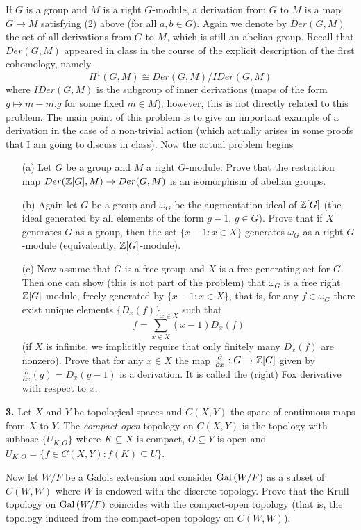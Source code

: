 \documentclass[12pt]{amsart}
\begin{document}
If $G$ is a group and $M$ is a right $G$-module, a derivation from $G$ to $M$ is a map $G\to M$ satisfying (2) above (for all $a,b\in G$).
Again we denote by $Der(G,M)$ the set of all derivations from $G$ to $M$, which is still an abelian group. 
Recall that $Der(G,M)$ appeared in class in the course of the explicit description of the first cohomology,
namely $$H^1(G,M)\cong Der(G,M)/IDer(G,M)$$ where $IDer(G,M)$ is the subgroup of inner derivations (maps of the form $g\mapsto m-m.g$
for some fixed $m\in M$); however, this is not directly related to this problem. The main point of this problem is to give an important example of a derivation in the case of a non-trivial action (which actually arises in some proofs that I am going to discuss in class).
\skv
Now the actual problem begins
\begin{itemize}
\item[(a)] Let $G$ be a group and $M$ a right $G$-module. Prove that the restriction map $Der({\mathbb Z}[G],M)\to Der(G,M)$ is an isomorphism of
abelian groups. 
\item[(b)] Again let $G$ be a group and $\omega_G$ be the augmentation ideal of ${\mathbb Z}[G]$ 
(the ideal generated by all elements of the form $g-1$, $g\in G$). Prove that if $X$ generates $G$ as a group, then the
set $\{x-1: x\in X\}$ generates $\omega_G$ as a right $G$-module (equivalently, ${\mathbb Z}[G]$-module).
\item[(c)] Now assume that $G$ is a free group and $X$ is a free generating set for $G$. Then one can show (this is not part of the problem) that
$\omega_G$ is a free right ${\mathbb Z}[G]$-module, freely generated by $\{x-1: x\in X\}$, that is, for any $f\in \omega_G$ there
exist unique elements $\{D_x(f)\}_{x\in X}$ such that $$f=\sum\limits_{x\in X} (x-1)D_x(f)$$ (if $X$ is infinite, we implicitly require that only finitely many $D_x(f)$ are nonzero). Prove that for any $x\in X$ the map $\frac{\partial}{\partial x}: G\to {\mathbb Z}[G]$
given by $\frac{\partial }{\partial x}(g)=D_x(g-1)$ is a derivation. It is called the (right) {Fox derivative} with respect to $x$.
\end{itemize}
\skv

{\bf 3.} Let $X$ and $Y$ be topological spaces and $C(X,Y)$ the space of continuous maps from $X$ to $Y$. The {\it compact-open} topology
on $C(X,Y)$ is the topology with subbase $\{U_{K,O}\}$ where $K\subseteq X$ is compact, $O\subseteq Y$ is open and 
$U_{K,O}=\{f\in C(X,Y): f(K)\subseteq U\}$.

Now let $W/F$ be a Galois extension and consider ${\rm Gal\,}(W/F)$ as a subset of $C(W,W)$ where $W$ is endowed with the discrete topology. Prove that
the Krull topology on ${\rm Gal\,}(W/F)$ coincides with the compact-open topology (that is, the topology induced from the compact-open topology on
$C(W,W)$).
\skv
\end{document}
